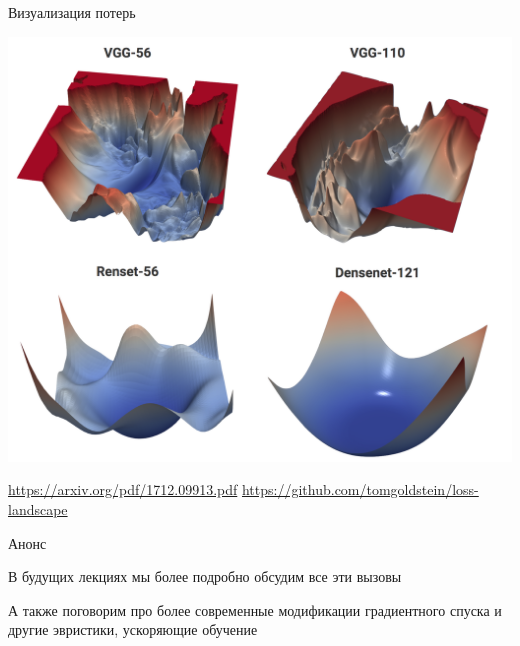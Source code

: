 \documentclass[notes,12pt, aspectratio=169]{beamer}
\newenvironment{wideitemize}{\itemize\addtolength{\itemsep}{10pt}}{\enditemize}
\begin{document}
\begin{frame}{Визуализация потерь}
\begin{center}
	\includegraphics[width=0.5\paperwidth]{loss.png}
\end{center}
\vfill %
\footnotesize 
\color{blue} \url{https://arxiv.org/pdf/1712.09913.pdf} \newline  \url{https://github.com/tomgoldstein/loss-landscape}
\end{frame}


\begin{frame}{Анонс}
	\begin{wideitemize}
		\item  В будущих лекциях мы более подробно обсудим все эти вызовы 
		\item А также поговорим про более современные модификации градиентного спуска и другие эвристики, ускоряющие обучение
	\end{wideitemize}
\end{frame}
\end{document}
